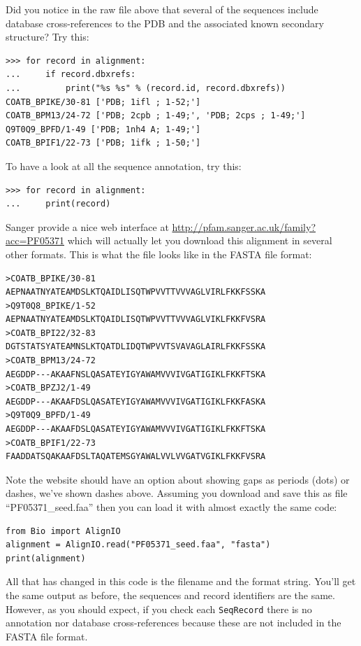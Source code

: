 \documentclass{report}
\begin{document}
Did you notice in the raw file above that several of the sequences include database cross-references to the PDB and the associated known secondary structure?  Try this:

\begin{verbatim}
>>> for record in alignment:
...     if record.dbxrefs:
...         print("%s %s" % (record.id, record.dbxrefs))
COATB_BPIKE/30-81 ['PDB; 1ifl ; 1-52;']
COATB_BPM13/24-72 ['PDB; 2cpb ; 1-49;', 'PDB; 2cps ; 1-49;']
Q9T0Q9_BPFD/1-49 ['PDB; 1nh4 A; 1-49;']
COATB_BPIF1/22-73 ['PDB; 1ifk ; 1-50;']
\end{verbatim}

\noindent To have a look at all the sequence annotation, try this:

\begin{verbatim}
>>> for record in alignment:
...     print(record)
\end{verbatim}

Sanger provide a nice web interface at \url{http://pfam.sanger.ac.uk/family?acc=PF05371} which will actually let you download this alignment in several other formats.  This is what the file looks like in the FASTA file format:

\begin{verbatim}
>COATB_BPIKE/30-81
AEPNAATNYATEAMDSLKTQAIDLISQTWPVVTTVVVAGLVIRLFKKFSSKA
>Q9T0Q8_BPIKE/1-52
AEPNAATNYATEAMDSLKTQAIDLISQTWPVVTTVVVAGLVIKLFKKFVSRA
>COATB_BPI22/32-83
DGTSTATSYATEAMNSLKTQATDLIDQTWPVVTSVAVAGLAIRLFKKFSSKA
>COATB_BPM13/24-72
AEGDDP---AKAAFNSLQASATEYIGYAWAMVVVIVGATIGIKLFKKFTSKA
>COATB_BPZJ2/1-49
AEGDDP---AKAAFDSLQASATEYIGYAWAMVVVIVGATIGIKLFKKFASKA
>Q9T0Q9_BPFD/1-49
AEGDDP---AKAAFDSLQASATEYIGYAWAMVVVIVGATIGIKLFKKFTSKA
>COATB_BPIF1/22-73
FAADDATSQAKAAFDSLTAQATEMSGYAWALVVLVVGATVGIKLFKKFVSRA
\end{verbatim}

\noindent Note the website should have an option about showing gaps as periods (dots) or dashes, we've shown dashes above.  Assuming you download and save this as file ``PF05371\_seed.faa'' then you can load it with almost exactly the same code:

\begin{verbatim}
from Bio import AlignIO
alignment = AlignIO.read("PF05371_seed.faa", "fasta")
print(alignment)
\end{verbatim}

All that has changed in this code is the filename and the format string.  You'll get the same output as before, the sequences and record identifiers are the same.
However, as you should expect, if you check each \verb|SeqRecord| there is no annotation nor database cross-references because these are not included in the FASTA file format.
\end{document}
